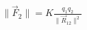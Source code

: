 \documentclass[preview]{standalone}
\begin{document}
\begin{align*}
\|\vec{F}_2\| = K \frac{q_1 q_2}{\|\vec{R}_{12}\|^2}
\end{align*}
\end{document}
